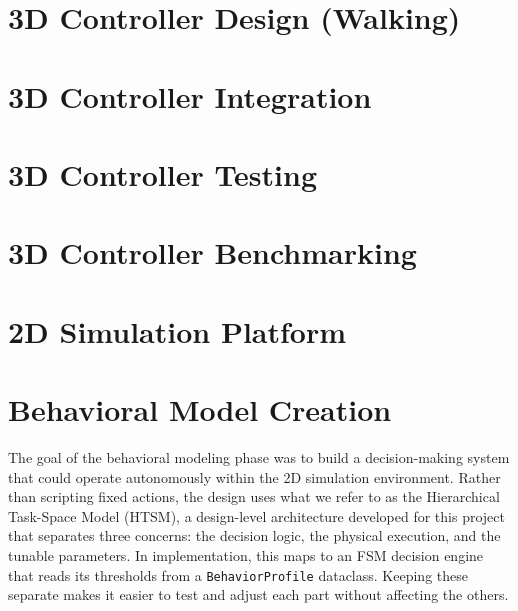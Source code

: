 \documentclass[12pt, a4paper]{report}
\begin{document}
\section{3D Controller Design (Walking)}


\section{3D Controller Integration}


\section{3D Controller Testing}


\section{3D Controller Benchmarking}


\section{2D Simulation Platform}


\section{Behavioral Model Creation}

The goal of the behavioral modeling phase was to build a decision-making
system that could operate autonomously within the 2D simulation environment.
Rather than scripting fixed actions, the design uses what we refer to as
the Hierarchical Task-Space Model (HTSM), a design-level architecture
developed for this project that separates three concerns: the decision
logic, the physical execution, and the tunable parameters.
In implementation, this maps to an FSM decision engine that reads its
thresholds from a \texttt{BehaviorProfile} dataclass.
Keeping these separate makes it easier to test and adjust each part without
affecting the others.
\end{document}
